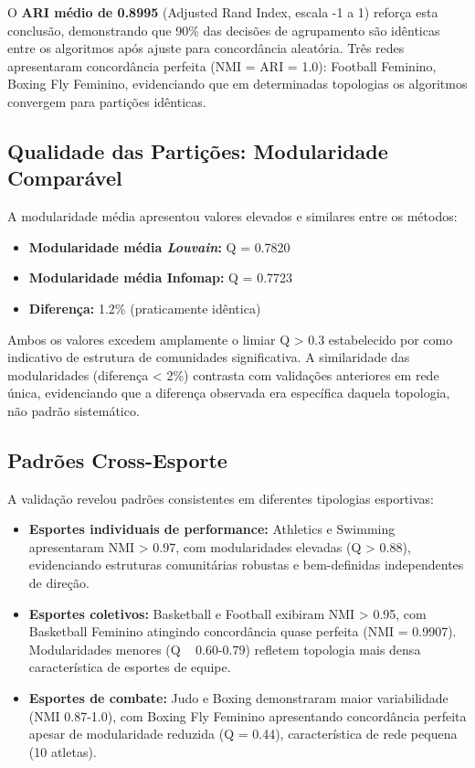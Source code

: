 O \textbf{ARI médio de 0.8995} (Adjusted Rand Index, escala -1 a 1) reforça esta conclusão, demonstrando que 90\% das decisões de agrupamento são idênticas entre os algoritmos após ajuste para concordância aleatória. Três redes apresentaram concordância perfeita (NMI = ARI = 1.0): Football Feminino, Boxing Fly Feminino, evidenciando que em determinadas topologias os algoritmos convergem para partições idênticas.

\subsection{Qualidade das Partições: Modularidade Comparável}

A modularidade média apresentou valores elevados e similares entre os métodos:

\begin{itemize}
    \item \textbf{Modularidade média \textit{Louvain}:} Q = 0.7820
    \item \textbf{Modularidade média Infomap:} Q = 0.7723
    \item \textbf{Diferença:} 1.2\% (praticamente idêntica)
\end{itemize}

Ambos os valores excedem amplamente o limiar Q > 0.3 estabelecido por  como indicativo de estrutura de comunidades significativa. A similaridade das modularidades (diferença < 2\%) contrasta com validações anteriores em rede única, evidenciando que a diferença observada era específica daquela topologia, não padrão sistemático.

\subsection{Padrões Cross-Esporte}

A validação revelou padrões consistentes em diferentes tipologias esportivas:

\begin{itemize}
    \item \textbf{Esportes individuais de performance:} Athletics e Swimming apresentaram NMI > 0.97, com modularidades elevadas (Q > 0.88), evidenciando estruturas comunitárias robustas e bem-definidas independentes de direção.

    \item \textbf{Esportes coletivos:} Basketball e Football exibiram NMI > 0.95, com Basketball Feminino atingindo concordância quase perfeita (NMI = 0.9907). Modularidades menores (Q ~ 0.60-0.79) refletem topologia mais densa característica de esportes de equipe.

    \item \textbf{Esportes de combate:} Judo e Boxing demonstraram maior variabilidade (NMI 0.87-1.0), com Boxing Fly Feminino apresentando concordância perfeita apesar de modularidade reduzida (Q = 0.44), característica de rede pequena (10 atletas).
\end{itemize}

